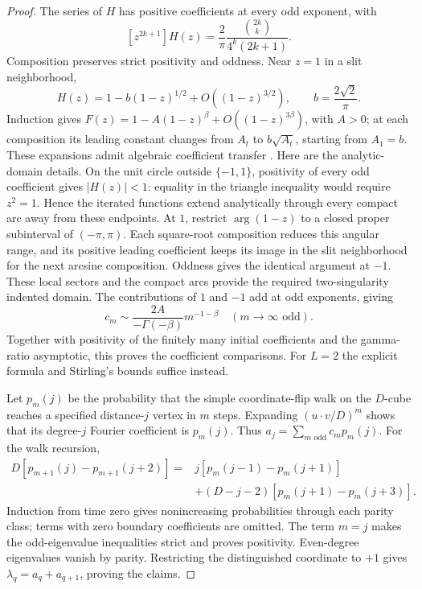 \begin{proof}
The series of $H$ has positive coefficients at every odd exponent,
with
\[
 [z^{2k+1}]H(z)=\frac2\pi\frac{\binom{2k}{k}}{4^k(2k+1)}.
\]
Composition preserves strict positivity and oddness. Near $z=1$ in
a slit neighborhood,
\[
 H(z)=1-b(1-z)^{1/2}+O((1-z)^{3/2}),
 \qquad b=\frac{2\sqrt2}{\pi}.
\]
Induction gives
$F(z)=1-A(1-z)^\beta+O((1-z)^{3\beta})$, with $A>0$;
at each composition its leading constant changes from $A_t$ to
$b\sqrt{A_t}$, starting from $A_1=b$.
These expansions admit algebraic coefficient transfer
\cite[Chapter VI]{flajolet2009}. Here are the analytic-domain details.
On the unit circle outside $\{-1,1\}$, positivity of every odd
coefficient gives $|H(z)|<1$: equality in the triangle inequality
would require $z^2=1$. Hence the iterated functions extend
analytically through every compact arc away from these endpoints.
At $1$, restrict $\arg(1-z)$ to a closed proper subinterval of
$(-\pi,\pi)$. Each square-root composition reduces this angular
range, and its positive leading coefficient keeps its image in the
slit neighborhood for the next arcsine composition. Oddness gives
the identical argument at $-1$. These local sectors and the compact
arcs provide the required two-singularity indented domain.
The contributions of $1$ and $-1$ add at odd exponents, giving
\[
 c_m\sim\frac{2A}{-\Gamma(-\beta)}m^{-1-\beta}
 \quad(m\to\infty\text{ odd}).
\]
Together with positivity of the finitely many initial coefficients
and the gamma-ratio asymptotic, this proves the coefficient comparisons.
For $L=2$ the explicit formula and Stirling's bounds suffice instead.

Let $p_m(j)$ be the probability that the simple coordinate-flip walk
on the $D$-cube reaches a specified distance-$j$ vertex in $m$ steps.
Expanding $(u\cdot v/D)^m$ shows that its degree-$j$ Fourier coefficient
is $p_m(j)$. Thus $a_j=\sum_{m\text{ odd}}c_mp_m(j)$.
For the walk recursion,
\begin{align*}
 D[p_{m+1}(j)-p_{m+1}(j+2)]
 ={}&j[p_m(j-1)-p_m(j+1)]\\
 &+(D-j-2)[p_m(j+1)-p_m(j+3)].
\end{align*}
Induction from time zero gives nonincreasing probabilities through
each parity class; terms with zero boundary coefficients are omitted.
The term $m=j$ makes the odd-eigenvalue inequalities strict and proves
positivity. Even-degree eigenvalues vanish by parity.
Restricting the distinguished coordinate to $+1$ gives
$\lambda_q=a_q+a_{q+1}$, proving the claims.
\end{proof}

